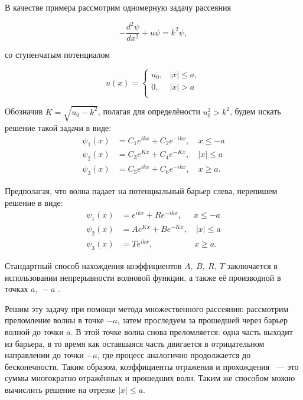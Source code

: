 \documentclass[a4 paper, 12 pt]{extarticle}
\begin{document}
   В качестве примера рассмотрим одномерную задачу рассеяния

   \begin{equation}\label{ScattPrBarr}
   -\frac{d^2\psi}{d x^2}+u\psi=k^2\psi,
   \end{equation}

   со ступенчатым потенциалом

   \begin{equation*}\label{BarrierPot}
   u(x)=\left\{%
   \begin{array}{ll}
   u_0, & |x|\leq a, \\
   0, & |x|>a \\
   \end{array}%
   \right.
   \end{equation*}

   Обозначив $K = \sqrt{u_0-k^2}$, полагая для определёности $u_0^2 > k^2$, будем искать решение такой задачи в виде:
   \[\begin{split}
   \psi_1\left(x\right) &= C_1 e^{ikx} + C_2 e^{-ikx}, \quad x\leq -a\\
   \psi_2\left(x\right) &= C_3 e^{Kx} + C_4 e^{-Kx}, \quad \left|x\right|\leq a\\
   \psi_3\left(x\right) &= C_5 e^{ikx} + C_6 e^{-ikx}, \quad x \geq a.
   \end{split}\]

   Предполагая, что волна падает на потенциальный барьер слева, перепишем решение в виде:
   \[\begin{split}
   \psi_1\left(x\right) &= e^{ikx} + R e^{-ikx}, \quad \ \ x\leq -a\\
   \psi_2\left(x\right) &= Ae^{Kx} + B e^{-Kx}, \quad \left|x\right|\leq a\\
   \psi_3\left(x\right) &= T e^{ikx}, \quad \quad \quad \quad \quad x \geq a.
   \end{split}\]

   Стандартный способ нахождения коэффициентов $A,\  B, \  R,\  T$  заключается в использовании непрерывности волновой функции, а также её производной в точках $a, \ -a$ \cite{Peisakhovich}.

   Решим эту задачу при помощи метода множественного рассеяния: рассмотрим преломление волны в точке $-a$, затем проследуем за прошедшей через барьер волной до точки $a$. В этой точке волна снова преломляется: одна часть выходит из барьера, в то время как оставшаяся часть двигается в отрицательном направлении до точки $-a$, где процесс аналогично продолжается до бесконечности. Таким образом, коэффициенты отражения и прохождения ~--- это суммы многократно отражённых и прошедших волн. Таким же способом можно вычислить решение на отрезке $\left|x\right|\leq a$.
\end{document}
